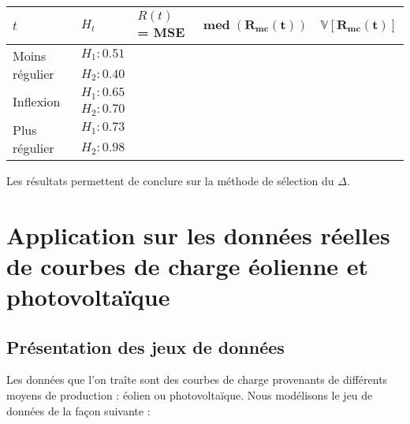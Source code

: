 \begin{table}[H]
	\centering
	\begin{tabularx}{\textwidth}{|X|X|X|X|X|}
		\toprule
		$t$                                  & $H_t$        & \textbf{$R(t)$ = MSE} & $\mathbf{\operatorname{med}(R_{mc}(t))}$ & $\mathbf{\mathds V[R_{mc}(t)]}$
		\\
		\midrule
		\multirow{2}{\hsize}{Moins régulier} & $H_1 : 0.51$ &                       &                                          &
		\\
		                                     & $H_2 : 0.40$ &                       &                                          &
		\\
		\midrule
		\multirow{2}{\hsize}{Inflexion}      & $H_1 : 0.65$ &                       &                                          &
		\\
		                                     & $H_2 : 0.70$ &                       &                                          &
		\\
		\midrule
		\multirow{2}{\hsize}{Plus régulier}  & $H_1 : 0.73$ &                       &                                          &
		\\
		                                     & $H_2 : 0.98$ &                       &                                          &
		\\
		\bottomrule
	\end{tabularx}
\end{table}

Les résultats permettent de conclure sur la méthode de sélection du $\Delta$.

\section{
  Application sur les données réelles de courbes de charge éolienne et photovoltaïque
 }

\subsection{Présentation des jeux de données}

Les données que l'on traîte sont des courbes de charge provenants de différents moyens de production : éolien ou photovoltaïque. Nous modélisons le jeu de données de la façon suivante :



